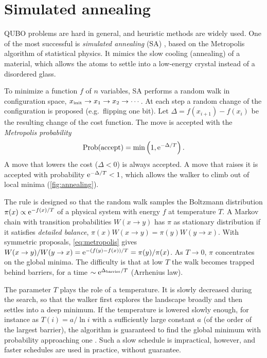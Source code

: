 \section{Simulated annealing}
QUBO problems are hard in general, and heuristic methods are widely used. One of the most successful is \emph{simulated annealing} (SA) \cite{Kirkpatrick1983}, based on the Metropolis algorithm of statistical physics.
It mimics the slow cooling (annealing) of a material, which allows the atoms to settle into a low-energy crystal instead of a disordered glass.

To minimize a function $f$ of $n$ variables, SA performs a random walk in configuration space, $x_{\rm init}\to x_1\to x_2\to\cdots$. At each step a random change of the configuration is proposed (e.g.\ flipping one bit).
Let $\Delta=f(x_{i+1})-f(x_i)$ be the resulting change of the cost function. The move is accepted with the \emph{Metropolis probability}
\begin{equation}\label{eq:metropolis}
  \mathrm{Prob(accept)}=\min\left(1,\mathrm e^{-\Delta/T}\right).
\end{equation}
A move that lowers the cost ($\Delta<0$) is always accepted. A move that raises it is accepted with probability $\mathrm e^{-\Delta/T}<1$, which allows the walker to climb out of local minima (\cref{fig:annealing}).

\begin{origin}
The rule is designed so that the random walk samples the Boltzmann distribution $\pi(x)\propto\mathrm e^{-f(x)/T}$ of a physical system with energy $f$ at temperature $T$. A Markov chain with transition probabilities $W(x\to y)$
has $\pi$ as stationary distribution if it satisfies \emph{detailed balance}, $\pi(x)W(x\to y)=\pi(y)W(y\to x)$. With symmetric proposals, \cref{eq:metropolis} gives
$W(x\to y)/W(y\to x)=\mathrm e^{-(f(y)-f(x))/T}=\pi(y)/\pi(x)$. As $T\to0$, $\pi$ concentrates on the global minima. The difficulty is that at low $T$ the walk becomes trapped behind barriers, for a time
$\sim\mathrm e^{\Delta_{\rm barrier}/T}$ (Arrhenius law).
\end{origin}
The parameter $T$ plays the role of a temperature. It is slowly decreased during the search, so that the walker first explores the landscape broadly and then settles into a deep minimum. If the temperature is lowered slowly
enough, for instance as $T(i)=a/\ln i$ with a sufficiently large constant $a$ (of the order of the largest barrier), the algorithm is guaranteed to find the global minimum with probability approaching one \cite{Geman1984}.
Such a slow schedule is impractical, however, and faster schedules are used in practice, without guarantee.

